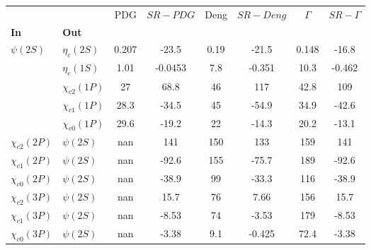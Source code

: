 \begin{tabular}{l|l|c|c|c|c|c|c}
\toprule
                &            &   PDG & $SR-PDG$ &  Deng & $SR-Deng$ &  $\Gamma$ & $SR-\Gamma$ \\
\textbf{In} & \textbf{Out} &       &          &       &           &           &             \\
\midrule
\textbf{$\psi(2S)$} & \textbf{$\eta_{c}(2S)$} & 0.207 &    -23.5 &  0.19 &     -21.5 &     0.148 &       -16.8 \\
                & \textbf{$\eta_{c}(1S)$} &  1.01 &  -0.0453 &   7.8 &    -0.351 &      10.3 &      -0.462 \\
                & \textbf{$\chi_{c2}(1P)$} &    27 &     68.8 &    46 &       117 &      42.8 &         109 \\
                & \textbf{$\chi_{c1}(1P)$} &  28.3 &    -34.5 &    45 &     -54.9 &      34.9 &       -42.6 \\
                & \textbf{$\chi_{c0}(1P)$} &  29.6 &    -19.2 &    22 &     -14.3 &      20.2 &       -13.1 \\
\textbf{$\chi_{c2}(2P)$} & \textbf{$\psi(2S)$} &   nan &      141 &   150 &       133 &       159 &         141 \\
\textbf{$\chi_{c1}(2P)$} & \textbf{$\psi(2S)$} &   nan &    -92.6 &   155 &     -75.7 &       189 &       -92.6 \\
\textbf{$\chi_{c0}(2P)$} & \textbf{$\psi(2S)$} &   nan &    -38.9 &    99 &     -33.3 &       116 &       -38.9 \\
\textbf{$\chi_{c2}(3P)$} & \textbf{$\psi(2S)$} &   nan &     15.7 &    76 &      7.66 &       156 &        15.7 \\
\textbf{$\chi_{c1}(3P)$} & \textbf{$\psi(2S)$} &   nan &    -8.53 &    74 &     -3.53 &       179 &       -8.53 \\
\textbf{$\chi_{c0}(3P)$} & \textbf{$\psi(2S)$} &   nan &    -3.38 &   9.1 &    -0.425 &      72.4 &       -3.38 \\
\bottomrule
\end{tabular}
